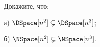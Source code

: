 Докажите, что:
\begin{enumcyr}
    \item [а)] $\DSpace[n^2] \subsetneq \DSpace[n^3]$;
    \item [б)] $\NSpace[n^2] \subsetneq \NSpace[n^3]$.
\end{enumcyr}